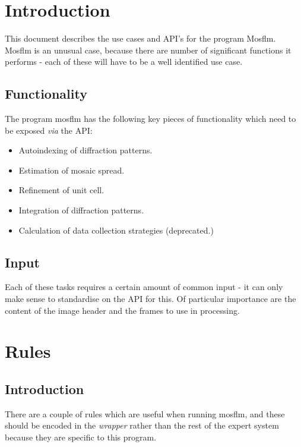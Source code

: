 \documentclass[a4paper, 11pt]{article}
\begin{document}
\section{Introduction}

This document describes the use cases and API's for the program Mosflm.
Mosflm is an unusual case, because there are number of significant 
functions it performs - each of these will have to be a well identified 
use case.

\subsection{Functionality}

The program mosflm has the following key pieces of functionality which need 
to be exposed \emph{via} the API:

\begin{itemize}
\item{Autoindexing of diffraction patterns.}
\item{Estimation of mosaic spread.}
\item{Refinement of unit cell.}
\item{Integration of diffraction patterns.}
\item{Calculation of data collection strategies (deprecated.)}
\end{itemize}

\subsection{Input}

Each of these tasks requires a certain amount of common input - it can only 
make sense to standardise on the API for this. Of particular importance
are the content of the image header and the frames to use in processing.

\section{Rules}

\subsection{Introduction}

There are a couple of rules which are useful when running mosflm, and these
should be encoded in the \emph{wrapper} rather than the rest of the expert
system because they are specific to this program.
\end{document}
